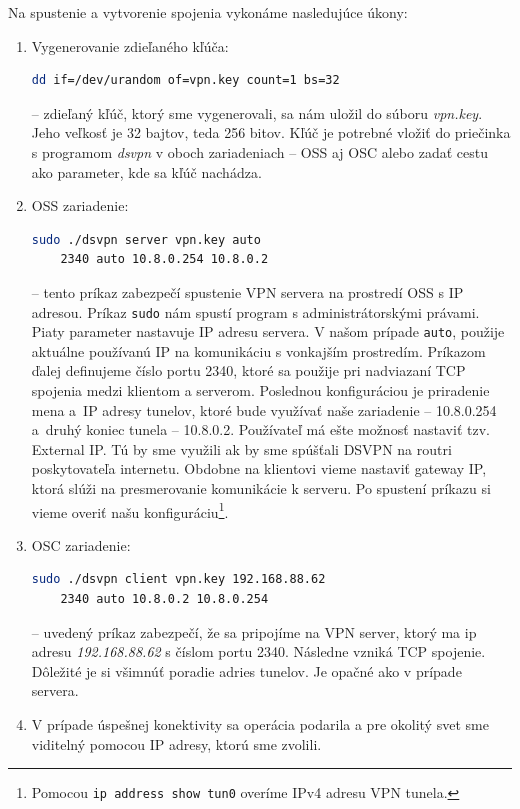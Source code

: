 Na spustenie a vytvorenie spojenia vykonáme nasledujúce úkony:
\begin{enumerate}
	\item Vygenerovanie zdieľaného kľúča:\begin{lstlisting}[language=bash]
		dd if=/dev/urandom of=vpn.key count=1 bs=32
	\end{lstlisting} 
-- zdieľaný kľúč, ktorý sme vygenerovali, sa nám uložil do súboru \textit{vpn.key}. Jeho veľkosť je 32 bajtov, teda 256 bitov. Kľúč je potrebné vložiť do priečinka s programom \textit{dsvpn} v oboch zariadeniach -- OSS aj OSC alebo zadať cestu ako parameter, kde sa kľúč nachádza.
	\item OSS zariadenie: \begin{lstlisting}[language=bash] 
	sudo ./dsvpn server vpn.key auto 
	2340 auto 10.8.0.254 10.8.0.2
	\end{lstlisting} 
-- tento príkaz zabezpečí spustenie VPN servera na prostredí OSS s IP adresou. Príkaz \lstinline|sudo| nám spustí program s administrátorskými právami. Piaty parameter nastavuje IP adresu servera. V našom prípade \lstinline|auto|, použije aktuálne používanú IP na komunikáciu s vonkajším prostredím. Príkazom ďalej definujeme číslo portu 2340, ktoré sa použije pri nadviazaní TCP spojenia medzi klientom a serverom. Poslednou konfiguráciou je priradenie mena a~IP adresy tunelov, ktoré bude využívať naše zariadenie -- 10.8.0.254 a~druhý koniec tunela -- 10.8.0.2. Používateľ má ešte možnosť nastaviť tzv. External IP. Tú by sme využili ak by sme spúšťali DSVPN na routri poskytovateľa internetu. Obdobne na klientovi vieme nastaviť gateway IP, ktorá slúži na presmerovanie komunikácie k serveru. Po spustení príkazu si vieme overiť našu konfiguráciu\footnote{Pomocou \lstinline|ip address show tun0| overíme IPv4 adresu VPN tunela.}. 
	\item OSC zariadenie: \begin{lstlisting}[language=bash] 
	sudo ./dsvpn client vpn.key 192.168.88.62 
	2340 auto 10.8.0.2 10.8.0.254
	\end{lstlisting} 
-- uvedený príkaz zabezpečí, že sa pripojíme na VPN server, ktorý ma ip adresu \textit{192.168.88.62} s číslom portu 2340. Následne vzniká TCP spojenie. Dôležité je si všimnúť poradie adries tunelov. Je opačné ako v prípade servera. 
	\item V prípade úspešnej konektivity sa operácia podarila a pre okolitý svet sme viditelný pomocou IP adresy, ktorú sme zvolili. 
\end{enumerate}

